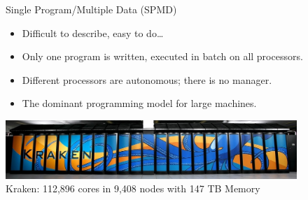 \begin{frame}
  \begin{block}{Single Program/Multiple Data (SPMD)}\pause
    \begin{itemize}
      \item Difficult to describe, easy to do\dots
      \item Only one program is written, executed in batch on all processors.
      \item Different processors are autonomous; there is no manager.
      \item The dominant programming model for large machines.
    \end{itemize}
  \end{block}
  \begin{center}
    \includegraphics[width=11cm]{../common/pics/kraken1wide.jpg} \\
    Kraken: 112,896 cores in 9,408 nodes with 147 TB Memory
    \end{center}
\end{frame}

